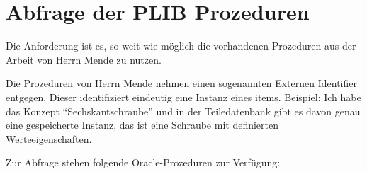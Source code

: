 \section{Abfrage der PLIB Prozeduren}\label{sec:abfrage_plib_prozeduren}

Die Anforderung ist es, so weit wie möglich die vorhandenen Prozeduren aus der Arbeit von Herrn Mende zu nutzen. 

Die Prozeduren von Herrn Mende nehmen einen sogenannten Externen Identifier entgegen. Dieser identifiziert eindeutig eine Instanz eines \glspl{item}. 
Beispiel: Ich habe das Konzept \enquote{Sechskantschraube} und in der Teiledatenbank gibt es davon genau eine gespeicherte Instanz, das ist eine Schraube mit definierten Werteeigenschaften. 

Zur Abfrage stehen folgende Oracle-Prozeduren zur Verfügung:

